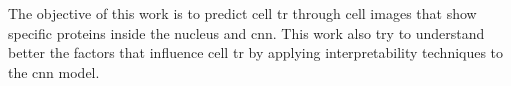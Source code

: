 The objective of this work is to predict cell \gls{tr} through cell images that show specific proteins inside the nucleus and \gls{cnn}. This work also try to understand better the factors that influence cell \gls{tr} by applying interpretability techniques to the \gls{cnn} model.
